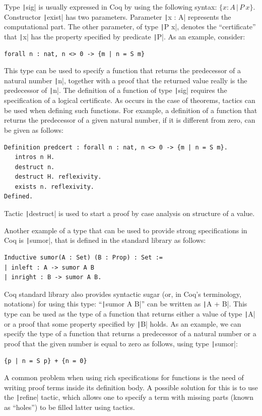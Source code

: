 \documentclass[oneside,12pt]{scrbook}
\theoremstyle{definition}
\newcommand{\coq}[1]{\texttt|#1|}
\theoremstyle{plain}
\theoremstyle{definition}
\begin{document}
Type \coq{sig} is usually expressed in Coq by using the following
syntax: $\{x : A \,\vert\,P\:x\}$.
Constructor \coq{exist} has two
parameters. Parameter \coq{x : A} represents the
computational part. The other parameter, of type \coq{P x}, denotes
the ``certificate'' that \coq{x} has the property specified by
predicate \coq{P}. As an example, consider:
\begin{verbatim}
forall n : nat, n <> 0 -> {m | n = S m}
\end{verbatim}
This type can be used to specify a function that returns the
predecessor of a natural number \coq{n}, together with a proof that
the returned value really is the predecessor of \coq{n}. The
definition of a function of type \coq{sig} requires the specification
of a logical certificate. As occurs in the case of theorems, tactics
can be used when defining such functions. For example, a
definition of a function that returns the predecessor of a given
natural number, if it is different from zero, can be given as follows:

\begin{verbatim}
Definition predcert : forall n : nat, n <> 0 -> {m | n = S m}.
   intros n H.
   destruct n.
   destruct H. reflexivity.
   exists n. reflexivity.
Defined.
\end{verbatim}

Tactic \coq{destruct} is used to start a proof by case analysis on
structure of a value.

Another example of a type that can be used to provide strong
specifications in Coq is \coq{sumor}, that is defined in the
standard library as follows:
\begin{verbatim}
Inductive sumor(A : Set) (B : Prop) : Set :=
| inleft : A -> sumor A B
| inright : B -> sumor A B.
\end{verbatim}

Coq standard library also provides syntactic sugar (or, in Coq's
terminology, notations) for using this type: ``\coq{sumor A B}'' can
be written as \coq{A + {B}}.
This type can be used as the type of a function that returns either a
value of type \coq{A} or a proof that some property specified by
\coq{B} holds.
As an example, we can specify the type of a function that returns a
predecessor of a natural number or a proof that the given number is
equal to zero as follows, using type \coq{sumor}:
\begin{verbatim}
{p | n = S p} + {n = 0}
\end{verbatim}  
A common problem when using rich specifications for functions is the need
of writing proof terms inside its definition body. A possible solution for
this is to use the \coq{refine} tactic, which allows one to specify a term with
missing parts (known as ``holes'') to be filled latter using tactics.
\end{document}
